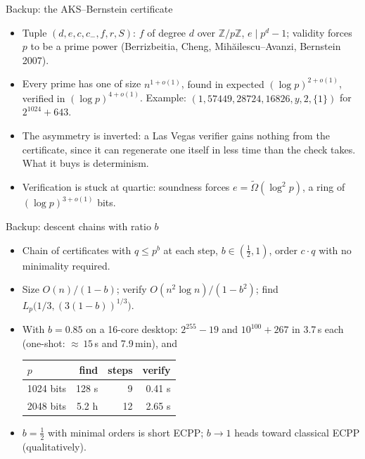 \documentclass[aspectratio=169,11pt]{beamer}
\newcommand{\Z}{\mathbb{Z}}
\newcommand{\find}[1]{{\color{fred}#1}}
\newcommand{\ver}[1]{{\color{vblue}#1}}
\begin{document}
\begin{frame}{Backup: the AKS--Bernstein certificate}
\begin{itemize}
\item Tuple $(d, e, c, c_-, f, r, S)$: $f$ of degree $d$ over $\Z/p\Z$, $e \mid p^d - 1$; validity
forces $p$ to be a prime power (Berrizbeitia, Cheng, Mih\u{a}ilescu--Avanzi, Bernstein 2007).
\item Every prime has one of size $n^{1+o(1)}$, \find{found in expected $(\log p)^{2+o(1)}$},
\ver{verified in $(\log p)^{4+o(1)}$}.  Example: $(1, 57449, 28724, 16826, y, 2, \{1\})$ for
$2^{1024}+643$.
\item The asymmetry is inverted: a Las Vegas verifier gains nothing from the certificate, since it
can regenerate one itself in less time than the check takes.  What it buys is determinism.
\item Verification is stuck at quartic: soundness forces $e = \widetilde\Omega(\log^2 p)$, a ring
of $(\log p)^{3+o(1)}$ bits.
\end{itemize}
\end{frame}

\begin{frame}{Backup: descent chains with ratio $b$}
\begin{itemize}
\item Chain of certificates with $q \le p^b$ at each step, $b\in(\tfrac12, 1)$, order $c\cdot q$
with no minimality required.
\item Size $O(n)/(1-b)$; \ver{verify $O(n^2\log n)/(1-b^2)$}; \find{find
$L_p\bigl(1/3, (3(1-b))^{1/3}\bigr)$}.
\item With $b = 0.85$ on a 16-core desktop: $2^{255}-19$ and $10^{100}+267$ in 3.7\,s each
(one-shot: ${\approx}\,15$\,s and 7.9\,min), and
\begin{center}\small
\begin{tabular}{@{}lrrr@{}}
\toprule
$p$ & find & steps & verify\\
\midrule
1024 bits & 128 s & 9 & 0.41 s\\
2048 bits & 5.2 h & 12 & 2.65 s\\
\bottomrule
\end{tabular}
\end{center}
\item $b = \tfrac12$ with minimal orders is short ECPP; $b\to1$ heads toward classical ECPP
(qualitatively).
\end{itemize}
\end{frame}
\end{document}
